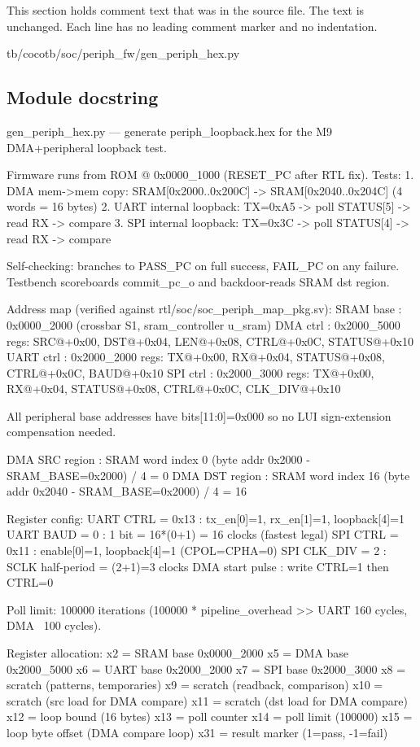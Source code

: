 This section holds comment text that was in the source file. The text is unchanged. Each line has no leading comment marker and no indentation.

\begin{relocated}{tb/cocotb/soc/periph_fw/gen_periph_hex.py}

\subsection*{Module docstring}

\begin{textblock}
gen_periph_hex.py — generate periph_loopback.hex for the M9 DMA+peripheral loopback test.

Firmware runs from ROM @ 0x0000_1000 (RESET_PC after RTL fix).
Tests:
1. DMA mem->mem copy: SRAM[0x2000..0x200C] -> SRAM[0x2040..0x204C]  (4 words = 16 bytes)
2. UART internal loopback: TX=0xA5 -> poll STATUS[5] -> read RX -> compare
3. SPI  internal loopback: TX=0x3C -> poll STATUS[4] -> read RX -> compare

Self-checking: branches to PASS_PC on full success, FAIL_PC on any failure.
Testbench scoreboards commit_pc_o and backdoor-reads SRAM dst region.

Address map (verified against rtl/soc/soc_periph_map_pkg.sv):
SRAM base   : 0x0000_2000  (crossbar S1, sram_controller u_sram)
DMA ctrl    : 0x2000_5000  regs: SRC@+0x00, DST@+0x04, LEN@+0x08, CTRL@+0x0C, STATUS@+0x10
UART ctrl   : 0x2000_2000  regs: TX@+0x00, RX@+0x04, STATUS@+0x08, CTRL@+0x0C, BAUD@+0x10
SPI  ctrl   : 0x2000_3000  regs: TX@+0x00, RX@+0x04, STATUS@+0x08, CTRL@+0x0C, CLK_DIV@+0x10

All peripheral base addresses have bits[11:0]=0x000 so no LUI sign-extension compensation needed.

DMA SRC region : SRAM word index 0  (byte addr 0x2000 - SRAM_BASE=0x2000) / 4 = 0
DMA DST region : SRAM word index 16 (byte addr 0x2040 - SRAM_BASE=0x2000) / 4 = 16

Register config:
UART CTRL = 0x13  : tx_en[0]=1, rx_en[1]=1, loopback[4]=1
UART BAUD = 0     : 1 bit = 16*(0+1) = 16 clocks (fastest legal)
SPI  CTRL = 0x11  : enable[0]=1, loopback[4]=1  (CPOL=CPHA=0)
SPI  CLK_DIV = 2  : SCLK half-period = (2+1)=3 clocks
DMA  start pulse  : write CTRL=1 then CTRL=0

Poll limit: 100000 iterations (100000 * pipeline_overhead >> UART 160 cycles, DMA ~100 cycles).

Register allocation:
x2  = SRAM base  0x0000_2000
x5  = DMA base   0x2000_5000
x6  = UART base  0x2000_2000
x7  = SPI base   0x2000_3000
x8  = scratch (patterns, temporaries)
x9  = scratch (readback, comparison)
x10 = scratch (src load for DMA compare)
x11 = scratch (dst load for DMA compare)
x12 = loop bound (16 bytes)
x13 = poll counter
x14 = poll limit (100000)
x15 = loop byte offset (DMA compare loop)
x31 = result marker (1=pass, -1=fail)
\end{textblock}

\end{relocated}

